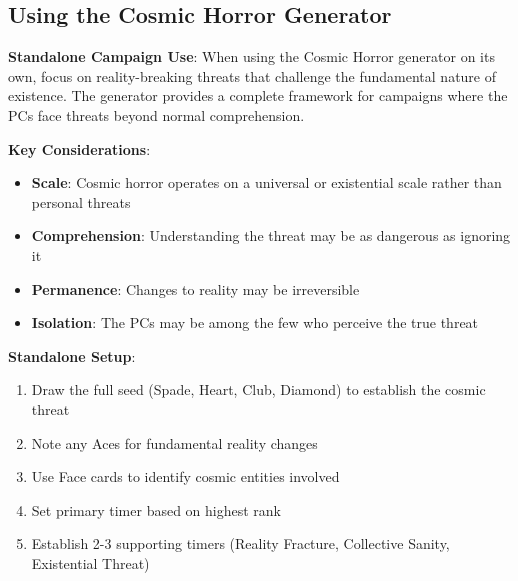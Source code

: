 \documentclass[11pt]{article}
\begin{document}
\subsection*{Using the Cosmic Horror Generator}

\begin{mdframed}[backgroundcolor=shadecolor]
\textbf{Standalone Campaign Use}:
When using the Cosmic Horror generator on its own, focus on reality-breaking threats that challenge the fundamental nature of existence. The generator provides a complete framework for campaigns where the PCs face threats beyond normal comprehension.

\textbf{Key Considerations}:
\begin{itemize}[leftmargin=*]
\item \textbf{Scale}: Cosmic horror operates on a universal or existential scale rather than personal threats
\item \textbf{Comprehension}: Understanding the threat may be as dangerous as ignoring it
\item \textbf{Permanence}: Changes to reality may be irreversible
\item \textbf{Isolation}: The PCs may be among the few who perceive the true threat
\end{itemize}

\textbf{Standalone Setup}:
\begin{enumerate}[leftmargin=*]
\item Draw the full seed (Spade, Heart, Club, Diamond) to establish the cosmic threat
\item Note any Aces for fundamental reality changes
\item Use Face cards to identify cosmic entities involved
\item Set primary timer based on highest rank
\item Establish 2-3 supporting timers (Reality Fracture, Collective Sanity, Existential Threat)
\end{enumerate}
\end{mdframed}
\end{document}
